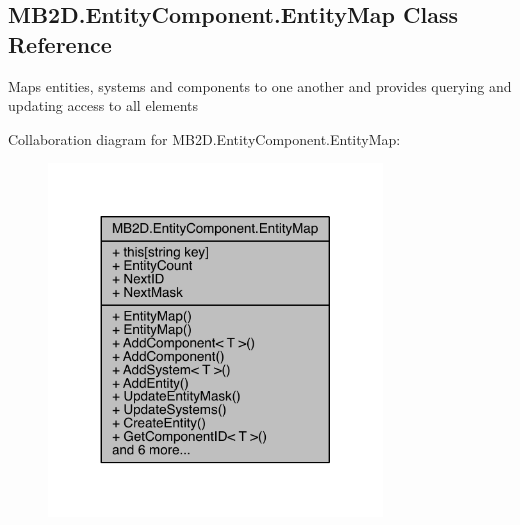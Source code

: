\hypertarget{class_m_b2_d_1_1_entity_component_1_1_entity_map}{}\subsection{M\+B2\+D.\+Entity\+Component.\+Entity\+Map Class Reference}
\label{class_m_b2_d_1_1_entity_component_1_1_entity_map}


Maps entities, systems and components to one another and provides querying and updating access to all elements  




Collaboration diagram for M\+B2\+D.\+Entity\+Component.\+Entity\+Map\+:
\nopagebreak
\begin{figure}[H]
\begin{center}
\leavevmode
\includegraphics[width=251pt]{class_m_b2_d_1_1_entity_component_1_1_entity_map__coll__graph}
\end{center}
\end{figure}
